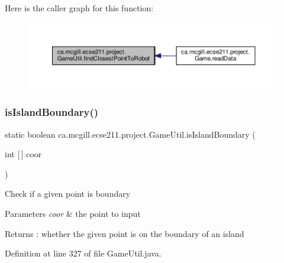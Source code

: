 Here is the caller graph for this function\+:\nopagebreak
\begin{figure}[H]
\begin{center}
\leavevmode
\includegraphics[width=350pt]{classca_1_1mcgill_1_1ecse211_1_1project_1_1_game_util_a6e0ee94b800ca3727ca8009782abda14_icgraph}
\end{center}
\end{figure}
\mbox{\label{classca_1_1mcgill_1_1ecse211_1_1project_1_1_game_util_a5783c3415e13b66362a647504b63741a}} 
\subsubsection{\texorpdfstring{is\+Island\+Boundary()}{isIslandBoundary()}}
{\footnotesize\ttfamily static boolean ca.\+mcgill.\+ecse211.\+project.\+Game\+Util.\+is\+Island\+Boundary (\begin{DoxyParamCaption}\item[{int \mbox{[}$\,$\mbox{]}}]{coor }\end{DoxyParamCaption})\hspace{0.3cm}{\ttfamily [static]}}

Check if a given point is boundary


\begin{DoxyParams}{Parameters}
{\em coor} & the point to input \\
\hline
\end{DoxyParams}
\begin{DoxyReturn}{Returns}
\+: whether the given point is on the boundary of an island 
\end{DoxyReturn}


Definition at line 327 of file Game\+Util.\+java.


